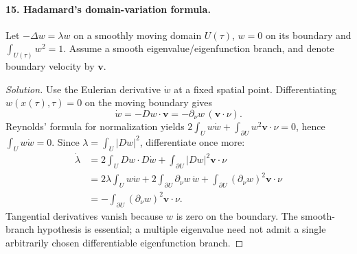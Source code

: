 \Needspace{30mm}
\paragraph{15. Hadamard's domain-variation formula.}
Let $-\Delta w=\lambda w$ on a smoothly moving domain $U(\tau)$,
$w=0$ on its boundary and $\int_{U(\tau)}w^2=1$.
Assume a smooth eigenvalue/eigenfunction branch, and denote boundary
velocity by $\mathbf v$.
\begin{proof}[Solution]
Use the Eulerian derivative $\dot w$ at a fixed spatial point.
Differentiating $w(x(\tau),\tau)=0$ on the moving boundary gives
\[
 \dot w=-Dw\cdot\mathbf v
       =-\partial_\nu w\,(\mathbf v\cdot\nu).
\]
Reynolds' formula for normalization yields
$2\int_Uw\dot w+\int_{\partial U}w^2\mathbf v\cdot\nu=0$,
hence $\int_Uw\dot w=0$.
Since $\lambda=\int_U|Dw|^2$, differentiate once more:
\begin{align*}
 \dot\lambda
 &=2\int_U Dw\cdot D\dot w+
             \int_{\partial U}|Dw|^2\mathbf v\cdot\nu\\
 &=2\lambda\int_Uw\dot w+
      2\int_{\partial U}\partial_\nu w\,\dot w+
             \int_{\partial U}(\partial_\nu w)^2\mathbf v\cdot\nu\\
 &=-\int_{\partial U}(\partial_\nu w)^2\mathbf v\cdot\nu.
\end{align*}
Tangential derivatives vanish because $w$ is zero on the boundary.
The smooth-branch hypothesis is essential; a multiple eigenvalue need
not admit a single arbitrarily chosen differentiable eigenfunction branch.
\end{proof}
\Needspace{45mm}

\Needspace{30mm}

\Needspace{45mm}
